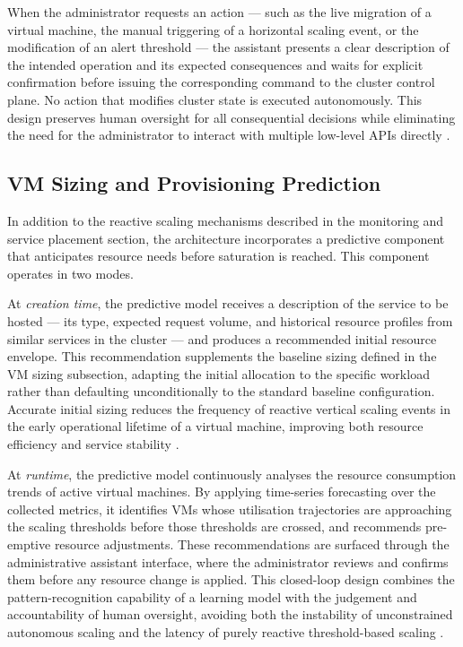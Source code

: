 \documentclass[a4paper, 12pt]{report}
\begin{document}
When the administrator requests an action --- such as the live migration
of a virtual machine, the manual triggering of a horizontal scaling
event, or the modification of an alert threshold --- the assistant
presents a clear description of the intended operation and its expected
consequences and waits for explicit confirmation before issuing the
corresponding command to the cluster control plane.  No action that
modifies cluster state is executed autonomously.  This design preserves
human oversight for all consequential decisions while eliminating the
need for the administrator to interact with multiple low-level APIs
directly \cite{meng2020survey}.
 
\subsection{VM Sizing and Provisioning Prediction}
 
In addition to the reactive scaling mechanisms described in the monitoring
and service placement section, the architecture incorporates a predictive
component that anticipates resource needs before saturation is reached.
This component operates in two modes.
 
At \textit{creation time}, the predictive model receives a description
of the service to be hosted --- its type, expected request volume, and
historical resource profiles from similar services in the cluster --- and
produces a recommended initial resource envelope.  This recommendation
supplements the baseline sizing defined in the VM sizing subsection,
adapting the initial allocation to the specific workload rather than
defaulting unconditionally to the standard baseline configuration.
Accurate initial sizing reduces the frequency of reactive vertical
scaling events in the early operational lifetime of a virtual machine,
improving both resource efficiency and service stability \cite{buyya2009cloud}.
 
At \textit{runtime}, the predictive model continuously analyses the
resource consumption trends of active virtual machines.  By applying
time-series forecasting over the collected metrics, it identifies VMs
whose utilisation trajectories are approaching the scaling thresholds
before those thresholds are crossed, and recommends pre-emptive resource
adjustments.  These recommendations are surfaced through the
administrative assistant interface, where the administrator reviews and
confirms them before any resource change is applied.  This closed-loop
design combines the pattern-recognition capability of a learning model
with the judgement and accountability of human oversight, avoiding
both the instability of unconstrained autonomous scaling and the
latency of purely reactive threshold-based scaling \cite{meng2020survey}.
 
\end{document}
